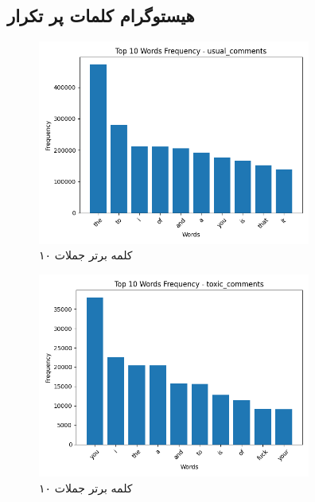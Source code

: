 \clearpage


\clearpage

\subsection{هیستوگرام کلمات پر تکرار} 

\begin{figure}[htbp]
  \centering
  \includegraphics[width=0.8\textwidth]{stats/top_ten_histogram_usual_comments.png}
  \caption{۱۰ کلمه برتر جملات }
  \label{fig:unique_common_words_total}
\end{figure}

\begin{figure}
  \centering
  \includegraphics[width=0.8\textwidth]{stats/top_ten_histogram_toxic_comments.png}
  \caption{۱۰ کلمه برتر جملات }
  \label{fig:unique_uncommon_words_count}
\end{figure}

